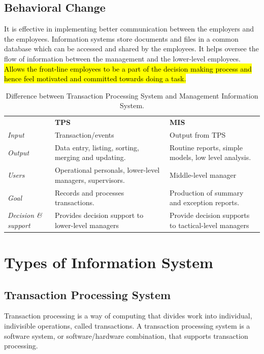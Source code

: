 \documentclass[12pt, a4paper]{article}
\begin{document}
\subsection{Behavioral Change}
It is effective in implementing better communication between the employers and
the employees. Information systems store documents and files in a common
database which can be accessed and shared by the employees. It helps oversee
the flow of information between the management and the lower-level employees.
\hl{Allows the front-line employees to be a part of the decision making
process and hence feel motivated and committed towards doing a task.}


\begin{table}[ht]
  \centering
  \begin{tabular}{p{2cm}p{6cm}p{6cm}}
  \toprule
  &
  \textbf{TPS}&
  \textbf{MIS}\\
  \cmidrule(r){2-3}
 
  \emph{Input}&
  Transaction/events &
  Output from TPS\\
  \midrule

  \emph{Output}&
    Data entry, listing, sorting, merging and updating. &
    Routine reports, simple models, low level analysis.\\
  \midrule

  \emph{Users}&
    Operational personals, lower-level managers, supervisors. &
    Middle-level manager\\
  \midrule

  \emph{Goal}&
    Records and processes transactions. &
    Production of summary and exception reports.\\
  \midrule

  \emph{Decision \& support} &
    Provides decision support to lower-level managers &
    Provide decision supports to tactical-level managers\\
  \bottomrule

\end{tabular}
  \caption{Difference between Transaction Processing System and Management
  Information System.\label{difftpsmis}}
\end{table}%

\section{Types of Information System}%
\subsection{Transaction Processing System}%
Transaction processing is a way of computing that divides work into
individual, indivisible operations, called transactions. A transaction
processing system is a software system, or software/hardware combination, that
supports transaction processing.%
\end{document}
